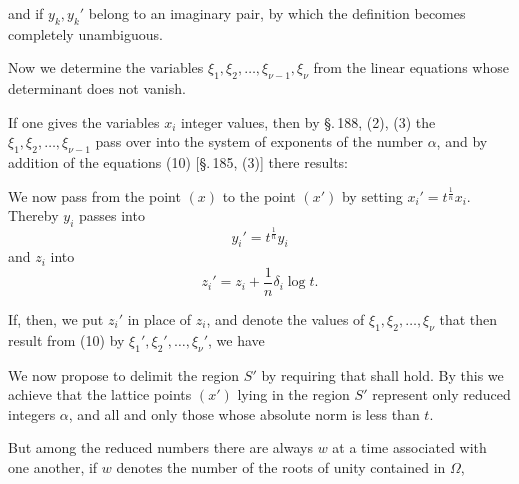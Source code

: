 and if $y_k, y_k'$ belong to an imaginary pair,
by which the definition becomes completely unambiguous.

Now we determine the variables $\xi_1, \xi_2, \ldots, \xi_{\nu-1}, \xi_\nu$ from the linear equations
whose determinant does not vanish.

If one gives the variables $x_i$ integer values, then by \S.\,188, (2), (3) the $\xi_1, \xi_2, \ldots, \xi_{\nu-1}$ pass over into the system of exponents of the number $\alpha$, and by addition of the equations (10) [\S.\,185, (3)] there results:

We now pass from the point $(x)$ to the point $(x')$ by setting $x_i' = t^{\frac{1}{n}} x_i$. Thereby $y_i$ passes into
\[ y_i' = t^{\frac{1}{n}} y_i \]
and $z_i$ into
\[ z_i' = z_i + \frac{1}{n} \delta_i \log t. \]

If, then, we put $z_i'$ in place of $z_i$, and denote the values of $\xi_1, \xi_2, \ldots, \xi_\nu$ that then result from (10) by $\xi_1', \xi_2', \ldots, \xi_\nu'$, we have

We now propose to delimit the region $S'$ by requiring that
shall hold. By this we achieve that the lattice points $(x')$ lying in the region $S'$ represent only reduced integers $\alpha$, and all and only those whose absolute norm is less than $t$.

But among the reduced numbers there are always $w$ at a time associated with one another, if $w$ denotes the number of the roots of unity contained in $\Omega$,
